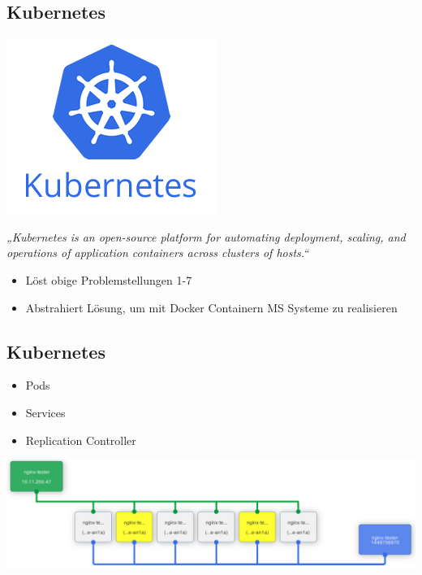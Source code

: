 \documentclass{beamer}
\begin{document}
\subsection{Kubernetes}
\begin{frame}{\insertsubsection}
	\centering
	\includegraphics[width=.3\linewidth]{img/kubernetes_logo.png}
	\vspace*{1em}

	\textit{„Kubernetes is an open-source platform for automating deployment, scaling, and operations of application containers across clusters of hosts.“}\cite{k8sdoc}
	\vspace*{1em}	
	\begin{itemize}
		\setlength\itemsep{1em}
		\item Löst obige Problemstellungen 1-7
		\item Abstrahiert Lösung, um mit Docker Containern MS Systeme zu realisieren
	\end{itemize}
\end{frame}

\subsection{Kubernetes}
\begin{frame}{\insertsubsection}
	\begin{itemize}
		\setlength\itemsep{1em}
		\item Pods
		\item Services
		\item Replication Controller
	\end{itemize}
	\vspace{1em}
	\includegraphics[width=\linewidth]{img/pods-getting-ready-k8s.pdf}
\end{frame}
		
\end{document}
